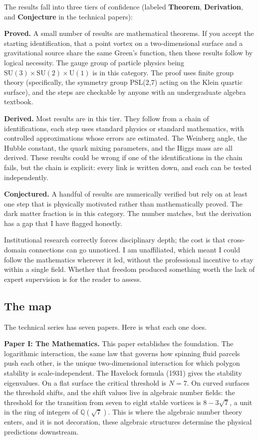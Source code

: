 The results fall into three tiers of confidence
(labeled \textbf{Theorem}, \textbf{Derivation}, and
\textbf{Conjecture} in the technical papers):

\textbf{Proved.} A small number of results are mathematical theorems.
If you accept the starting identification, that a point vortex on a
two-dimensional surface and a gravitational source share the same
Green's function, then these results follow by logical necessity. The
gauge group of particle physics being
$\mathrm{SU}(3) \times \mathrm{SU}(2) \times \mathrm{U}(1)$ is in
this category. The proof uses finite group theory (specifically, the
symmetry group PSL(2,7) acting on the Klein quartic surface), and the
steps are checkable by anyone with an undergraduate algebra textbook.

\textbf{Derived.} Most results are in this tier. They follow from a
chain of identifications, each step uses standard physics or
standard mathematics, with controlled approximations whose errors
are estimated. The Weinberg angle, the Hubble constant, the quark
mixing parameters, and the Higgs mass are all derived. These results
could be wrong if one of the identifications in the chain fails, but
the chain is explicit: every link is written down, and each can be
tested independently.

\textbf{Conjectured.} A handful of results are numerically verified
but rely on at least one step that is physically motivated rather than
mathematically proved. The dark matter fraction is in this category.
The number matches, but the derivation has a gap that I have flagged
honestly.

Institutional research correctly forces disciplinary depth; the cost
is that cross-domain connections can go unnoticed. I am unaffiliated,
which meant I could follow the mathematics wherever it led, without
the professional incentive to stay within a single field. Whether that
freedom produced something worth the lack of expert supervision is for
the reader to assess.


\subsection*{The map}

The technical series has seven papers. Here is what each one does.

\textbf{Paper I: The Mathematics.} This paper establishes the
foundation. The logarithmic interaction, the same law that governs
how spinning fluid parcels push each other, is the unique
two-dimensional interaction for which polygon stability is
scale-independent. The Havelock formula (1931) gives the stability
eigenvalues. On a flat surface the critical threshold is $N = 7$.
On curved surfaces the threshold shifts, and the shift values live
in algebraic number fields: the threshold for the transition from
seven to eight stable vortices is $8 - 3\sqrt{7}$, a unit in the
ring of integers of $\mathbb{Q}(\sqrt{7})$. This is where the
algebraic number theory enters, and it is not decoration, these
algebraic structures determine the physical predictions downstream.

